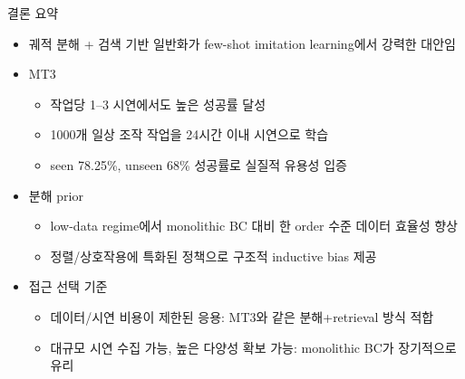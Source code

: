 \documentclass[aspectratio=169]{beamer}
\begin{document}
\begin{frame}{결론 요약}
  \small
  \begin{itemize}
    \item 궤적 분해 + 검색 기반 일반화가 few-shot imitation learning에서 강력한 대안임
    \item MT3
    \begin{itemize}
      \item 작업당 1–3 시연에서도 높은 성공률 달성
      \item 1000개 일상 조작 작업을 24시간 이내 시연으로 학습
      \item seen 78.25\%, unseen 68\% 성공률로 실질적 유용성 입증
    \end{itemize}
    \item 분해 prior
    \begin{itemize}
      \item low-data regime에서 monolithic BC 대비 한 order 수준 데이터 효율성 향상
      \item 정렬/상호작용에 특화된 정책으로 구조적 inductive bias 제공
    \end{itemize}
    \item 접근 선택 기준
    \begin{itemize}
      \item 데이터/시연 비용이 제한된 응용: MT3와 같은 분해+retrieval 방식 적합
      \item 대규모 시연 수집 가능, 높은 다양성 확보 가능: monolithic BC가 장기적으로 유리
    \end{itemize}
  \end{itemize}
\end{frame}
\end{document}
